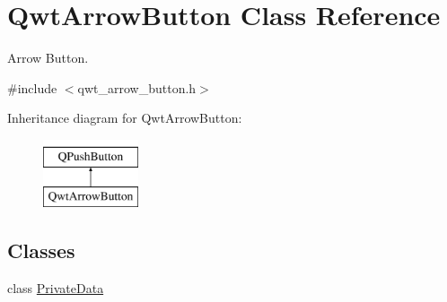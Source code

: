 \hypertarget{class_qwt_arrow_button}{\section{Qwt\-Arrow\-Button Class Reference}
\label{class_qwt_arrow_button}
}


Arrow Button.  




{\ttfamily \#include $<$qwt\-\_\-arrow\-\_\-button.\-h$>$}

Inheritance diagram for Qwt\-Arrow\-Button\-:\begin{figure}[H]
\begin{center}
\leavevmode
\includegraphics[height=2.000000cm]{class_qwt_arrow_button}
\end{center}
\end{figure}
\subsection*{Classes}
\begin{DoxyCompactItemize}
\item 
class \hyperlink{class_qwt_arrow_button_1_1_private_data}{Private\-Data}
\end{DoxyCompactItemize}
